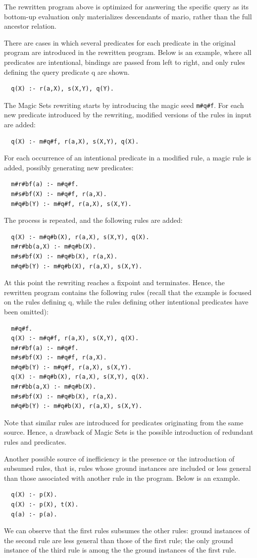 \documentclass[oneside]{book}
\begin{document}
The rewritten program above is optimized for answering the specific query as its bottom-up evaluation only materializes descendants of mario, rather than the full ancestor relation.

There are cases in which several predicates for each predicate in the original program are introduced in the rewritten program. Below is an example, where all predicates are intentional, bindings are passed from left to right, and only rules defining the query predicate q are shown.
\begin{verbatim}
  q(X) :- r(a,X), s(X,Y), q(Y).
\end{verbatim}

The Magic Sets rewriting starts by introducing the magic seed {\tt m\#q\#f}. For each new predicate introduced by the rewriting, modified versions of the rules in input are added:
\begin{verbatim}
  q(X) :- m#q#f, r(a,X), s(X,Y), q(X).
\end{verbatim}
For each occurrence of an intentional predicate in a modified rule, a magic rule is added, possibly generating new predicates:
\begin{verbatim}
  m#r#bf(a) :- m#q#f.
  m#s#bf(X) :- m#q#f, r(a,X).
  m#q#b(Y) :- m#q#f, r(a,X), s(X,Y).
\end{verbatim}
The process is repeated, and the following rules are added:
\begin{verbatim}
  q(X) :- m#q#b(X), r(a,X), s(X,Y), q(X).
  m#r#bb(a,X) :- m#q#b(X).
  m#s#bf(X) :- m#q#b(X), r(a,X).
  m#q#b(Y) :- m#q#b(X), r(a,X), s(X,Y).
\end{verbatim}
At this point the rewriting reaches a fixpoint and terminates. Hence, the rewritten program contains the following rules (recall that the example is focused on the rules defining q, while the rules defining other intentional predicates have been omitted):
\begin{verbatim}
  m#q#f.
  q(X) :- m#q#f, r(a,X), s(X,Y), q(X).
  m#r#bf(a) :- m#q#f.
  m#s#bf(X) :- m#q#f, r(a,X).
  m#q#b(Y) :- m#q#f, r(a,X), s(X,Y).
  q(X) :- m#q#b(X), r(a,X), s(X,Y), q(X).
  m#r#bb(a,X) :- m#q#b(X).
  m#s#bf(X) :- m#q#b(X), r(a,X).
  m#q#b(Y) :- m#q#b(X), r(a,X), s(X,Y).
\end{verbatim}
Note that similar rules are introduced for predicates originating from the same source. Hence, a drawback of Magic Sets is the possible introduction of redundant rules and predicates.

Another possible source of inefficiency is the presence or the introduction of subsumed rules, that is, rules whose ground instances are included or less general than those associated with another rule in the program. Below is an example.
\begin{verbatim}
  q(X) :- p(X).
  q(X) :- p(X), t(X).
  q(a) :- p(a).
\end{verbatim}
We can observe that the first rules subsumes the other rules: ground instances of the second rule are less general than those of the first rule; the only ground instance of the third rule is among the the ground instances of the first rule.
\end{document}
